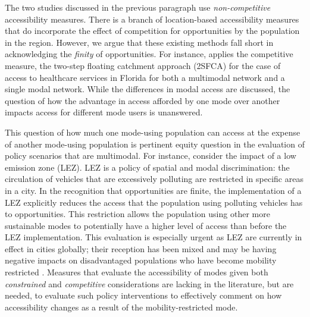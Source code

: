 \documentclass[numbered]{trbunofficial}
\begin{document}
The two studies discussed in the previous paragraph use
\emph{non-competitive} accessibility measures. There is a branch of
location-based accessibility measures that do incorporate the effect of
competition for opportunities by the population in the region. However,
we argue that these existing methods fall short in acknowledging the
\emph{finity} of opportunities. For instance,
\citet{maoMeasuringSpatialAccessibility2013} applies the competitive
measure, the two-step floating catchment approach (2SFCA) for the case
of access to healthcare services in Florida for both a multimodal
network and a single modal network. While the differences in modal
access are discussed, the question of how the advantage in access
afforded by one mode over another impacts access for different mode
users is unanswered.

This question of how much one mode-using population can access at the
expense of another mode-using population is pertinent equity question in
the evaluation of policy scenarios that are multimodal. For instance,
consider the impact of a low emission zone (LEZ). LEZ is a policy of
spatial and modal discrimination: the circulation of vehicles that are
excessively polluting are restricted in specific areas in a city. In the
recognition that opportunities are finite, the implementation of a LEZ
explicitly reduces the access that the population using polluting
vehicles has to opportunities. This restriction allows the population
using other more sustainable modes to potentially have a higher level of
access than before the LEZ implementation. This evaluation is especially
urgent as LEZ are currently in effect in cities globally; their
reception has been mixed \citep{tarrinoortizPublicAcceptabilityLow2021}
and may be having negative impacts on disadvantaged populations who have
become mobility restricted
\citep{devrijNooneVisitsMe2022, verbeekJustManagementUrban2022}.
Measures that evaluate the accessibility of modes given both
\emph{constrained} and \emph{competitive} considerations are lacking in
the literature, but are needed, to evaluate such policy interventions to
effectively comment on how accessibility changes as a result of the
mobility-restricted mode.
\end{document}
